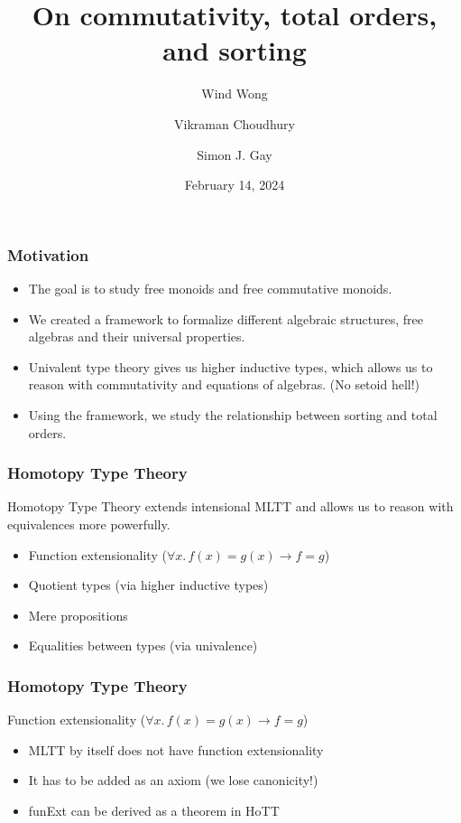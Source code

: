 \documentclass{beamer}
\title{On commutativity, total orders, and sorting}
\author[shortname]{
  Wind Wong \inst{1}
  \and Vikraman Choudhury \inst{2}
  \and Simon J. Gay \inst{1}
}
\institute[shortinst]{\inst{1} University of Glasgow \and %
                      \inst{2} Universit\`{a} di Bologna and OLAS Team, INRIA}
\date{February 14, 2024}
\begin{document}
\frame{\titlepage}

\begin{frame}
\frametitle{Motivation}

\begin{itemize}

  \item The goal is to study free monoids and free commutative monoids.

  \item We created a framework to formalize different algebraic structures, free algebras and
their universal properties.

  \item Univalent type theory gives us higher inductive types, which allows us to reason with
    commutativity and equations of algebras. (No setoid hell!)

  \item Using the framework, we study the relationship between sorting and total orders.

\end{itemize}

\end{frame}

\begin{frame}
\frametitle{Homotopy Type Theory}

Homotopy Type Theory extends intensional MLTT and allows us to reason with equivalences more
powerfully.

\begin{itemize}

  \item Function extensionality ($\forall x. \, f(x) = g(x) \rightarrow f = g$)

  \item Quotient types (via higher inductive types)

  \item Mere propositions

  \item Equalities between types (via univalence)

\end{itemize}

\end{frame}

\begin{frame}
\frametitle{Homotopy Type Theory}

Function extensionality ($\forall x. \, f(x) = g(x) \rightarrow f = g$)

\begin{itemize}

  \item MLTT by itself does not have function extensionality

  \item It has to be added as an axiom (we lose canonicity!)

  \item funExt can be derived as a theorem in HoTT

\end{itemize}

\end{frame}
\end{document}

